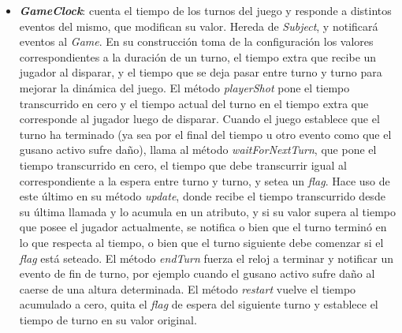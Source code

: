 \begin{itemize}
	\item \textbf{\textit{GameClock}}: cuenta el tiempo de los turnos del juego y responde a distintos eventos del mismo, que modifican su valor. Hereda de \textit{Subject}, y notificará eventos al \textit{Game}. En su construcción toma de la configuración los valores correspondientes a la duración de un turno, el tiempo extra que recibe un jugador al disparar, y el tiempo que se deja pasar entre turno y turno para mejorar la dinámica del juego. El método \textit{playerShot} pone el tiempo transcurrido en cero y el tiempo actual del turno en el tiempo extra que corresponde al jugador luego de disparar. Cuando el juego establece que el turno ha terminado (ya sea por el final del tiempo u otro evento como que el gusano activo sufre daño), llama al método \textit{waitForNextTurn}, que pone el tiempo transcurrido en cero, el tiempo que debe transcurrir igual al correspondiente a la espera entre turno y turno, y setea un \textit{flag}. Hace uso de este último en su método \textit{update}, donde recibe el tiempo transcurrido desde su última llamada y lo acumula en un atributo, y si su valor supera al tiempo que posee el jugador actualmente, se notifica o bien que el turno terminó en lo que respecta al tiempo, o bien que el turno siguiente debe comenzar si el \textit{flag} está seteado. El método \textit{endTurn} fuerza el reloj a terminar y notificar un evento de fin de turno, por ejemplo cuando el gusano activo sufre daño al caerse de una altura determinada. El método \textit{restart} vuelve el tiempo acumulado a cero, quita el \textit{flag} de espera del siguiente turno y establece el tiempo de turno en su valor original.
\end{itemize}